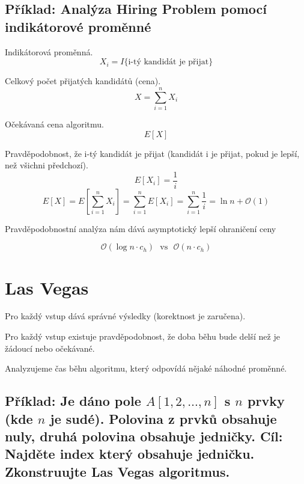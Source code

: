 \subsection{Příklad: Analýza Hiring Problem pomocí indikátorové proměnné}

\begin{compactitem}
    \item Indikátorová proměnná.
    $$ X_i = I\{ \text{i-tý kandidát je přijat} \}$$

    \item Celkový počet přijatých kandidátů (cena).
    $$ X = \sum_{i=1}^n X_i$$

    \item Očekávaná cena algoritmu.
    $$ E[X] $$

    \item Pravděpodobnost, že i-tý kandidát je přijat (kandidát i je přijat, pokud je lepší, než všichni předchozí).
    $$ E[X_i] = \frac{1}{i}$$
    $$ E[X] = E \left[ \sum_{i=1}^n X_i \right] = \sum_{i=1}^n E \left[ X_i \right] = \sum_{i=1}^n \frac{1}{i} = \ln{n} + \mathcal{O}(1)$$

    \item Pravděpodobnostní analýza nám dává asymptotický lepší ohraničení ceny

    $$ \mathcal{O}(\log{n} \cdot c_h) ~~~\text{vs}~~~ \mathcal{O}(n \cdot c_h)$$
\end{compactitem}


\section{Las Vegas}

\begin{compactitem}
    \item Pro každý vstup dává správné výsledky (korektnost je zaručena).

    \item Pro každý vstup existuje pravděpodobnost, že doba běhu bude delší než je žádoucí nebo očekávané.

    \item Analyzujeme čas běhu algoritmu, který odpovídá nějaké náhodné proměnné.
\end{compactitem}

\subsection{Příklad: Je dáno pole $A[1, 2, \dots, n]$ s $n$ prvky (kde $n$ je sudé). Polovina z prvků obsahuje nuly, druhá polovina obsahuje jedničky. Cíl: Najděte index který obsahuje jedničku. Zkonstruujte Las Vegas algoritmus.}

